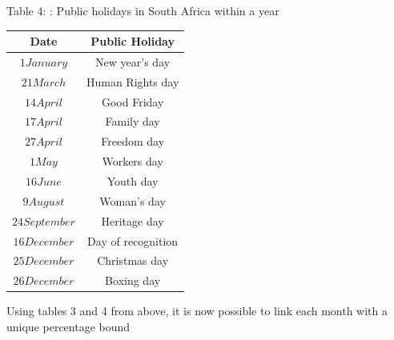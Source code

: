 \documentclass{article}
\begin{document}
\begin {center}
Table 4: {: Public holidays in South Africa within a year}

\end {center}
\begin{center}
\begin {tabular}{|c|c|}
\hline

Date& Public Holiday \\ [0.5ex]
\hline

 $1 January$&New year’s day\\
  $21 March$&Human Rights day\\
   $14 April$&Good Friday\\
    $17 April$&Family day\\
     $27 April$&Freedom day\\
      $1 May$&Workers day\\
       $16 June$&Youth day\\
        $9 August$&Woman’s day\\
         $24 September$&Heritage day\\
          $16 December$&Day of recognition\\
            $25 December$&Christmas day\\
              $26 December$&Boxing day\\
\hline

\end {tabular}

\end {center}
\begin{center}
    Using tables 3 and 4 from above, it is now possible to link each month with a unique percentage bound
\end{center}
\end{document}
